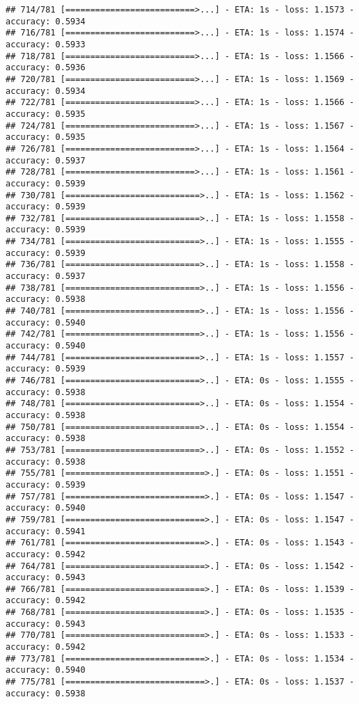 \documentclass[
]{article}
\begin{document}
\begin{verbatim}
## 714/781 [==========================>...] - ETA: 1s - loss: 1.1573 - accuracy: 0.5934
## 716/781 [==========================>...] - ETA: 1s - loss: 1.1574 - accuracy: 0.5933
## 718/781 [==========================>...] - ETA: 1s - loss: 1.1566 - accuracy: 0.5936
## 720/781 [==========================>...] - ETA: 1s - loss: 1.1569 - accuracy: 0.5934
## 722/781 [==========================>...] - ETA: 1s - loss: 1.1566 - accuracy: 0.5935
## 724/781 [==========================>...] - ETA: 1s - loss: 1.1567 - accuracy: 0.5935
## 726/781 [==========================>...] - ETA: 1s - loss: 1.1564 - accuracy: 0.5937
## 728/781 [==========================>...] - ETA: 1s - loss: 1.1561 - accuracy: 0.5939
## 730/781 [===========================>..] - ETA: 1s - loss: 1.1562 - accuracy: 0.5939
## 732/781 [===========================>..] - ETA: 1s - loss: 1.1558 - accuracy: 0.5939
## 734/781 [===========================>..] - ETA: 1s - loss: 1.1555 - accuracy: 0.5939
## 736/781 [===========================>..] - ETA: 1s - loss: 1.1558 - accuracy: 0.5937
## 738/781 [===========================>..] - ETA: 1s - loss: 1.1556 - accuracy: 0.5938
## 740/781 [===========================>..] - ETA: 1s - loss: 1.1556 - accuracy: 0.5940
## 742/781 [===========================>..] - ETA: 1s - loss: 1.1556 - accuracy: 0.5940
## 744/781 [===========================>..] - ETA: 1s - loss: 1.1557 - accuracy: 0.5939
## 746/781 [===========================>..] - ETA: 0s - loss: 1.1555 - accuracy: 0.5938
## 748/781 [===========================>..] - ETA: 0s - loss: 1.1554 - accuracy: 0.5938
## 750/781 [===========================>..] - ETA: 0s - loss: 1.1554 - accuracy: 0.5938
## 753/781 [===========================>..] - ETA: 0s - loss: 1.1552 - accuracy: 0.5938
## 755/781 [============================>.] - ETA: 0s - loss: 1.1551 - accuracy: 0.5939
## 757/781 [============================>.] - ETA: 0s - loss: 1.1547 - accuracy: 0.5940
## 759/781 [============================>.] - ETA: 0s - loss: 1.1547 - accuracy: 0.5941
## 761/781 [============================>.] - ETA: 0s - loss: 1.1543 - accuracy: 0.5942
## 764/781 [============================>.] - ETA: 0s - loss: 1.1542 - accuracy: 0.5943
## 766/781 [============================>.] - ETA: 0s - loss: 1.1539 - accuracy: 0.5942
## 768/781 [============================>.] - ETA: 0s - loss: 1.1535 - accuracy: 0.5943
## 770/781 [============================>.] - ETA: 0s - loss: 1.1533 - accuracy: 0.5942
## 773/781 [============================>.] - ETA: 0s - loss: 1.1534 - accuracy: 0.5940
## 775/781 [============================>.] - ETA: 0s - loss: 1.1537 - accuracy: 0.5938

\end{verbatim}
\end{document}
